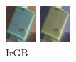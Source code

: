 \documentclass[a4paper,12pt]{article}  %
\begin{document}
\begin{figure}[H]
\begin{minipage}{0.24\textwidth}
        \includegraphics[width=\linewidth]{spektralne/irgb_budynek0.png}
        \caption*{IrGB}
    \end{minipage}
    \begin{minipage}{0.24\textwidth}
        \centering
        \includegraphics[width=\linewidth]{spektralne/rgir_budynek0.png}

\end{minipage}
\end{figure}
\end{document}
